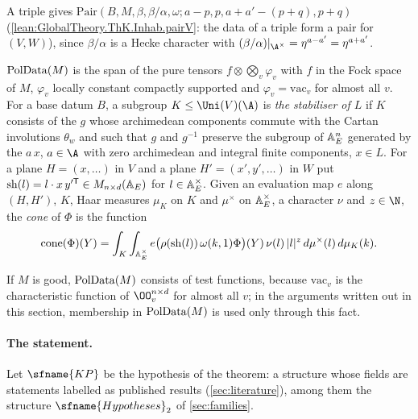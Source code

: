 A triple gives $\mathrm{Pair}(B,M,\beta,\beta/\alpha,\omega;a-p,p,a+a'-(p+q),p+q)$
(\cref{lean:GlobalTheory.ThK.Inhab.pairV}: the data of a triple form a pair for $(V,W)$), since $\beta/\alpha$ is a Hecke
character with $(\beta/\alpha)|_{\A^\times}=\eta^{a-a'}=\eta^{a+a'}$.

\begin{definition}\label{pf:thmK-cone:def-cone}
$\operatorname{PolData}(M)$ is the span of the pure tensors $f\otimes\bigotimes_v\varphi_v$ with $f$ in the Fock space of $M$,
$\varphi_v$ locally constant compactly supported and $\varphi_v=\mathrm{vac}_v$ for almost all $v$.  For a base datum $B$, a
subgroup $K\le\Uni(V)(\A)$ is \emph{the stabiliser of $L$} if $K$ consists of the $g$ whose archimedean components commute
with the Cartan involutions $\theta_w$ and such that $g$ and $g^{-1}$ preserve the subgroup of $\mathbb{A}_E^n$ generated by
the $a\,x$, $a\in\A$ with zero archimedean and integral finite components, $x\in L$.  For a plane $H=(x,\dots)$ in $V$ and
a plane $H'=(x',y',\dots)$ in $W$ put $\operatorname{sh}(l)=l\cdot x\,y'^{\mathsf T}\in M_{n\times d}(\mathbb{A}_E)$ for
$l\in\mathbb{A}_E^\times$.  Given an evaluation map $e$ along $(H,H')$, $K$, Haar measures $\mu_K$ on $K$ and $\mu^\times$
on $\mathbb{A}_E^\times$, a character $\nu$ and $z\in\N$, the \emph{cone} of $\Phi$ is the function
\begin{equation}\label{pf:thmK-cone:eq-cone}
  \operatorname{cone}(\Phi)(Y)=\int_K\int_{\mathbb{A}_E^\times}e\bigl(\rho(\operatorname{sh}(l))\,\omega(k,1)\Phi\bigr)(Y)\,
  \nu(l)\,|l|^z\,d\mu^\times(l)\,d\mu_K(k).
\end{equation}
\end{definition}

If $M$ is good, $\operatorname{PolData}(M)$ consists of test functions, because $\mathrm{vac}_v$ is the characteristic function of
$\OO_v^{n\times d}$ for almost all $v$; in the arguments written out in this section, membership in $\operatorname{PolData}(M)$ is
used only through this fact.

\paragraph{The statement.}
Let $\sfname{KP}$ be the hypothesis of the theorem: a structure whose fields are statements labelled as published results
(\cref{sec:literature}), among them the structure $\sfname{Hypotheses}_2$ of \cref{sec:families}.

